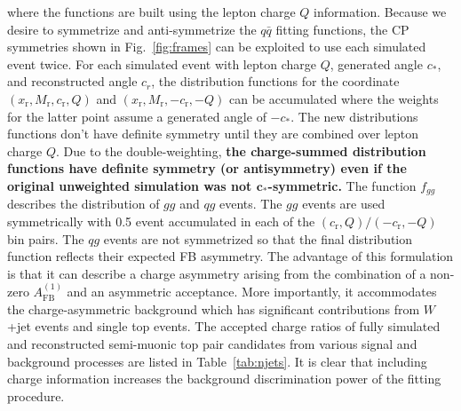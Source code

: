 where the functions are built using the lepton charge $Q$ information.  Because we desire to symmetrize and anti-symmetrize the $q\bar q$ fitting functions, the CP symmetries shown in Fig.~\ref{fig:frames} can be exploited to use each simulated event twice.  For each simulated event with lepton charge $Q$, generated angle $c_*$, and reconstructed angle $c_r$, the distribution functions for the coordinate $(x_\mathrm{r},M_\mathrm{r},c_\mathrm{r},Q)$ and $(x_\mathrm{r},M_\mathrm{r},-c_\mathrm{r},-Q)$ can be accumulated where the weights for the latter point assume a generated angle of $-c_*$.    The new distributions functions don't have definite symmetry until they are combined over lepton charge $Q$.  Due to the double-weighting, {\bf the charge-summed distribution functions have definite symmetry (or antisymmetry) even if the original unweighted simulation was not $\mathbf{c_*}$-symmetric.}  The function $f_{gg}$ describes the distribution of $gg$ and $qg$ events.  The $gg$ events are used symmetrically with 0.5 event accumulated in each of the $(c_\mathrm{r},Q)/(-c_\mathrm{r},-Q)$ bin pairs.  The $qg$ events are not symmetrized so that the final distribution function reflects their expected FB asymmetry.  The advantage of this formulation is that it can describe a charge asymmetry arising from the combination of a non-zero $A_\mathrm{FB}^{(1)}$ and an asymmetric acceptance.  More importantly, it accommodates the charge-asymmetric background which has significant contributions from $W$+jet events and single top events.  The accepted charge ratios of fully simulated and reconstructed semi-muonic top pair candidates from various signal and background processes are listed in Table~\ref{tab:njets}.  It is clear that including charge information increases the background discrimination power of the fitting procedure.

